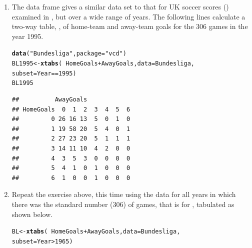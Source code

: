 \documentclass[11pt]{book}\usepackage[]{graphicx}\usepackage[]{color}
\makeatletter
\newcommand{\hlnum}[1]{\textcolor[rgb]{0.686,0.059,0.569}{#1}}%
\newcommand{\hlstr}[1]{\textcolor[rgb]{0.192,0.494,0.8}{#1}}%
\newcommand{\hlopt}[1]{\textcolor[rgb]{0,0,0}{#1}}%
\newcommand{\hlstd}[1]{\textcolor[rgb]{0.345,0.345,0.345}{#1}}%
\newcommand{\hlkwb}[1]{\textcolor[rgb]{0.69,0.353,0.396}{#1}}%
\newcommand{\hlkwc}[1]{\textcolor[rgb]{0.333,0.667,0.333}{#1}}%
\newcommand{\hlkwd}[1]{\textcolor[rgb]{0.737,0.353,0.396}{\textbf{#1}}}%
\newenvironment{kframe}{%
 \def\at@end@of@kframe{}%
 \ifinner\ifhmode%
  \def\at@end@of@kframe{\end{minipage}}%
  \begin{minipage}{\columnwidth}%
 \fi\fi%
 \def\FrameCommand##1{\hskip\@totalleftmargin \hskip-\fboxsep
 \colorbox{shadecolor}{##1}\hskip-\fboxsep
     \hskip-\linewidth \hskip-\@totalleftmargin \hskip\columnwidth}%
 \MakeFramed {\advance\hsize-\width
   \@totalleftmargin\z@ \linewidth\hsize
   \@setminipage}}%
 {\par\unskip\endMakeFramed%
 \at@end@of@kframe}
\newenvironment{knitrout}{}{} %
\renewenvironment{knitrout}{\small\renewcommand{\baselinestretch}{.85}}{} %
\makeatother
\begin{document}
\begin{enumerate}
  \item The data frame  gives a similar data set to that for UK soccer scores
  ()
  examined in , but over a wide range of years.  The following lines calculate
  a two-way table, , of home-team and away-team goals
  for the 306 games in the year 1995.
\begin{knitrout}
\color{fgcolor}\begin{kframe}
\begin{alltt}
\hlkwd{data}\hlstd{(}\hlstr{"Bundesliga"}\hlstd{,} \hlkwc{package}\hlstd{=}\hlstr{"vcd"}\hlstd{)}
\hlstd{BL1995} \hlkwb{<-} \hlkwd{xtabs}\hlstd{(}\hlopt{~}\hlstd{HomeGoals} \hlopt{+} \hlstd{AwayGoals,} \hlkwc{data}\hlstd{=Bundesliga,}
                \hlkwc{subset}\hlstd{= Year}\hlopt{==}\hlnum{1995}\hlstd{)}
\hlstd{BL1995}
\end{alltt}
\begin{verbatim}
##          AwayGoals
## HomeGoals  0  1  2  3  4  5  6
##         0 26 16 13  5  0  1  0
##         1 19 58 20  5  4  0  1
##         2 27 23 20  5  1  1  1
##         3 14 11 10  4  2  0  0
##         4  3  5  3  0  0  0  0
##         5  4  1  0  1  0  0  0
##         6  1  0  0  1  0  0  0
\end{verbatim}
\end{kframe}
\end{knitrout}


  \item \hard 
  Repeat the exercise above, this time using the data for all years in which there was
  the standard number (306) of games, that is for , tabulated as shown below.
\begin{knitrout}
\color{fgcolor}\begin{kframe}
\begin{alltt}
\hlstd{BL} \hlkwb{<-} \hlkwd{xtabs}\hlstd{(}\hlopt{~}\hlstd{HomeGoals} \hlopt{+} \hlstd{AwayGoals,} \hlkwc{data}\hlstd{=Bundesliga,}
            \hlkwc{subset}\hlstd{= Year}\hlopt{>}\hlnum{1965}\hlstd{)}
\end{alltt}
\end{kframe}
\end{knitrout}






\end{enumerate}
\end{document}
